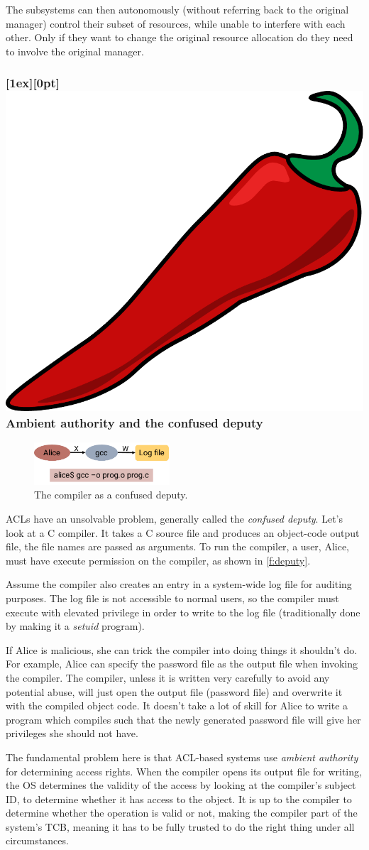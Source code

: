 \documentclass[english,a4paper,12pt\ifDraft,draft\fi]{report}
\newcommand{\SSSect}[1]{\subsubsection*{#1}}
\newcommand{\SSSect}[1]{\subsection*{#1}}
\newlength{\chillilng}\setlength{\chillilng}{8mm}
\newcommand{\chilli}{\includegraphics[width=\chillilng]{chilli}}
\newcommand{\chilliSect}{\raisebox{-2mm}[1ex][0pt]{\chilli\hspace{0.8em}}}
\begin{document}
  The subsystems can then autonomously (without referring back to the
  original manager) control their subset of resources, while unable
  to interfere with each other. Only if they want to change the original
  resource allocation do they need to involve the original manager.

  \SSSect{\chilliSect Ambient authority and the confused deputy}

  \begin{figure}[th]
    \centering
    \includegraphics[width=0.45\textwidth]{deputy}
    \caption{The compiler as a confused deputy.}
    \label{f:deputy}
  \end{figure}

  ACLs have an unsolvable problem, generally called the \emph{confused
  deputy}. Let's look at a C compiler. It takes a C source file and
  produces an object-code output file, the file names are passed as
  arguments. To run the compiler, a user, Alice, must have execute
  permission on the compiler, as shown in \autoref{f:deputy}.

  Assume the compiler also creates an entry in a system-wide log file
  for auditing purposes. The log file is not accessible to normal
  users, so the compiler must execute with elevated privilege in order
  to write to the log file (traditionally done by making it a
  \emph{setuid} program).

  If Alice is malicious, she can trick the compiler into doing things
  it shouldn't do. For example, Alice can specify the password file as
  the output file when invoking the compiler. The compiler, unless it
  is written very carefully to avoid any potential abuse, will just
  open the output file (password file) and overwrite it with the
  compiled object code. It doesn't take a lot of skill for Alice to
  write a program which compiles such that the newly generated
  password file will give her privileges she should not have.

  The fundamental problem here is that ACL-based systems use
  \emph{ambient authority} for determining access rights. When the
  compiler opens its output file for writing, the OS determines the
  validity of the access by looking at the compiler's subject ID, to
  determine whether it has access to the object. It is up to the
  compiler to determine whether the operation is valid or not, making
  the compiler part of the system's TCB, meaning it has to be fully
  trusted to do the right thing under all circumstances.
\end{document}
